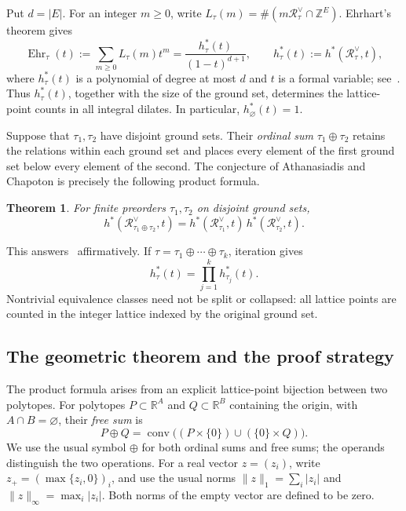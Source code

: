 \documentclass[11pt,reqno]{amsart}
\numberwithin{equation}{section}
\newtheorem{theorem}{Theorem}[section]
\theoremstyle{definition}
\theoremstyle{remark}
\theoremstyle{definition}
\newcommand{\Rpoly}[1]{\mathcal R_{#1}^{\vee}}
\DeclareMathOperator{\conv}{conv}
\DeclareMathOperator{\Ehr}{Ehr}
\begin{document}
Put $d=|E|$. For an integer $m\ge0$, write
$L_\tau(m)=\#(m\Rpoly{\tau}\cap\mathbb Z^E)$. Ehrhart's theorem gives
\begin{equation}\label{ehrdefinition}
 \Ehr_\tau(t):=\sum_{m\ge0}L_\tau(m)t^m
       =\frac{h_\tau^*(t)}{(1-t)^{d+1}},
 \qquad h_\tau^*(t):=h^*(\Rpoly{\tau},t),
\end{equation}
where $h_\tau^*(t)$ is a polynomial of degree at most $d$ and $t$ is a formal variable; see~\cite[Sections~3.4 and~3.5]{BR}. Thus $h_\tau^*(t)$, together with the size of the ground set, determines the lattice-point counts in all integral dilates. In particular, $h_\varnothing^*(t)=1$.

Suppose that $\tau_1,\tau_2$ have disjoint ground sets. Their \emph{ordinal sum} $\tau_1\oplus\tau_2$ retains the relations within each ground set and places every element of the first ground set below every element of the second. The conjecture of Athanasiadis and Chapoton is precisely the following product formula.

\begin{theorem}\label{main}
For finite preorders $\tau_1,\tau_2$ on disjoint ground sets,
\begin{equation}\label{hproduct}
 h^*(\Rpoly{\tau_1\oplus\tau_2},t)
       =h^*(\Rpoly{\tau_1},t)\,h^*(\Rpoly{\tau_2},t).
\end{equation}
\end{theorem}
This answers~\cite[Conjecture~6.3]{AC} affirmatively. If $\tau=\tau_1\oplus\cdots\oplus\tau_k$, iteration gives
\[
 h_\tau^*(t)=\prod_{j=1}^k h_{\tau_j}^*(t).
\]
Nontrivial equivalence classes need not be split or collapsed: all lattice points are counted in the integer lattice indexed by the original ground set.

\subsection{The geometric theorem and the proof strategy}
The product formula arises from an explicit lattice-point bijection between two polytopes. For polytopes $P\subset\mathbb R^A$ and $Q\subset\mathbb R^B$ containing the origin, with $A\cap B=\varnothing$, their \emph{free sum} is
\[
 P\oplus Q=\conv\bigl((P\times\{0\})\cup(\{0\}\times Q)\bigr).
\]
We use the usual symbol $\oplus$ for both ordinal sums and free sums; the operands distinguish the two operations. For a real vector $z=(z_i)$, write
$z_+=(\max\{z_i,0\})_i$, and use the usual norms
$\|z\|_1=\sum_i|z_i|$ and $\|z\|_\infty=\max_i|z_i|$. Both norms of the empty vector are defined to be zero.
\end{document}
